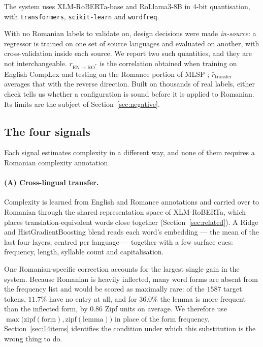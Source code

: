 \documentclass[11pt]{article}
\begin{document}
The system uses XLM-RoBERTa-base \citep{conneau2020xlmr} and RoLlama3-8B
\citep{masala-etal-2024-vorbesti} in 4-bit quantisation, with
\texttt{transformers}, \texttt{scikit-learn} and \texttt{wordfreq}.

With no Romanian labels to validate on, design decisions were made
\emph{in-source}: a regressor is trained on one set of source languages
and evaluated on another, with cross-validation inside each source. We
report two such quantities, and they are not interchangeable.
$r_{\mathrm{EN}\rightarrow\mathrm{RO}^{*}}$ is the correlation obtained
when training on English CompLex \citep{shardlow-etal-2021-semeval} and
testing on the Romance portion of MLSP \citep{shardlow-etal-2024-bea};
$\bar{r}_{\mathrm{transfer}}$ averages that with the reverse direction.
Built on thousands of real labels, either check tells us whether a
configuration is sound before it is applied to Romanian. Its limits are
the subject of Section~\ref{sec:negative}.

\subsection{The four signals}

Each signal estimates complexity in a different way, and none of them
requires a Romanian complexity annotation.

\paragraph{(A) Cross-lingual transfer.}
Complexity is learned from English and Romance annotations
\citep{shardlow-etal-2021-semeval, shardlow-etal-2024-bea} and carried
over to Romanian through the shared representation space of
XLM-RoBERTa, which places translation-equivalent words close together
(Section~\ref{sec:related}). A Ridge and HistGradientBoosting blend
reads each word's embedding --- the mean of the last four layers,
centred per language --- together with a few surface cues: frequency,
length, syllable count and capitalisation.

One Romanian-specific correction accounts for the largest single gain
in the system. Because Romanian is heavily inflected, many word forms
are absent from the frequency list and would be scored as maximally
rare: of the $1587$ target tokens, $11.7\%$ have no entry at all, and
for $36.0\%$ the lemma is more frequent than the inflected form, by
$0.86$ Zipf units on average. We therefore use
$\max\bigl(\mathrm{zipf}(\mathrm{form}), \mathrm{zipf}(\mathrm{lemma})\bigr)$
in place of the form frequency. Section~\ref{sec:14items} identifies the
condition under which this substitution is the wrong thing to do.
\end{document}
